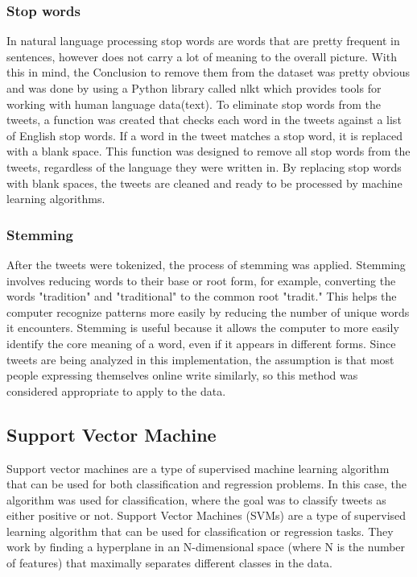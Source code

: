 \documentclass[conference]{IEEEtran}
\begin{document}
\subsubsection{Stop words}
In natural language processing stop words are words that are pretty frequent in sentences, however does not carry a lot of meaning to the overall picture.
With this in mind, the Conclusion to remove them from the dataset was pretty obvious and was done by using a Python library called nlkt\cite{nltk} which provides tools for working with human language data(text).\cite{albon2018machine}
\newline
\newline
To eliminate stop words from the tweets, a function was created that checks each word in the tweets against a list of English stop words. If a word in the tweet matches a stop word, it is replaced with a blank space. This function was designed to remove all stop words from the tweets, regardless of the language they were written in. By replacing stop words with blank spaces, the tweets are cleaned and ready to be processed by machine learning algorithms.\cite{nltk}
\subsubsection{Stemming}
After the tweets were tokenized, the process of stemming was applied. Stemming involves reducing words to their base or root form, for example, converting the words "tradition" and "traditional" to the common root "tradit." This helps the computer recognize patterns more easily by reducing the number of unique words it encounters. Stemming is useful because it allows the computer to more easily identify the core meaning of a word, even if it appears in different forms. \cite{albon2018machine}
\newline
\newline
Since tweets are being analyzed in this implementation, the assumption is that most people expressing themselves online write similarly, so this method was considered appropriate to apply to the data.
\subsection{Support Vector Machine}
Support vector machines are a type of supervised machine learning algorithm that can be used for both classification and regression problems. In this case, the algorithm was used for classification, where the goal was to classify tweets as either positive or not. \cite{albon2018machine} 
\newline
\newline
Support Vector Machines (SVMs) are a type of supervised learning algorithm that can be used for classification or regression tasks. They work by finding a hyperplane in an N-dimensional space (where N is the number of features) that maximally separates different classes in the data.
\end{document}
